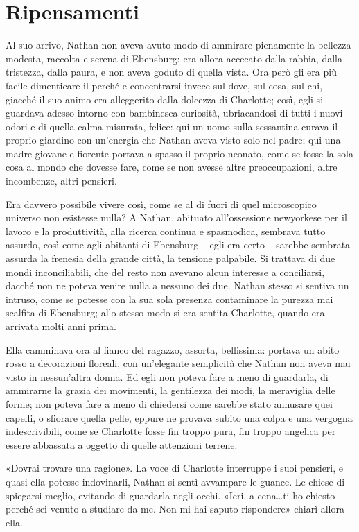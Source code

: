 \chapter{Ripensamenti}
\label{ch:ripensamenti}

Al suo arrivo, Nathan non aveva avuto modo di ammirare pienamente la bellezza modesta, raccolta e
serena di Ebensburg: era allora accecato dalla rabbia, dalla tristezza, dalla paura, e non aveva
goduto di quella vista. Ora però gli era più facile dimenticare il perché e concentrarsi invece sul
dove, sul cosa, sul chi, giacché il suo animo era alleggerito dalla dolcezza di Charlotte; così,
egli si guardava adesso intorno con bambinesca curiosità, ubriacandosi di tutti i nuovi odori e di
quella calma misurata, felice: qui un uomo sulla sessantina curava il proprio giardino con
un'energia che Nathan aveva visto solo nel padre; qui una madre giovane e fiorente portava a spasso
il proprio neonato, come se fosse la sola cosa al mondo che dovesse fare, come se non avesse altre
preoccupazioni, altre incombenze, altri pensieri.

Era davvero possibile vivere così, come se al di fuori di quel microscopico universo non esistesse
nulla? A Nathan, abituato all'ossessione newyorkese per il lavoro e la produttività, alla ricerca
continua e spasmodica, sembrava tutto assurdo, così come agli abitanti di Ebensburg -- egli era
certo -- sarebbe sembrata assurda la frenesia della grande città, la tensione palpabile. Si trattava
di due mondi inconciliabili, che del resto non avevano alcun interesse a conciliarsi, dacché non ne
poteva venire nulla a nessuno dei due. Nathan stesso si sentiva un intruso, come se potesse con la
sua sola presenza contaminare la purezza mai scalfita di Ebensburg; allo stesso modo si era sentita
Charlotte, quando era arrivata molti anni prima.

Ella camminava ora al fianco del ragazzo, assorta, bellissima: portava un abito rosso a decorazioni
floreali, con un'elegante semplicità che Nathan non aveva mai visto in nessun'altra donna. Ed egli
non poteva fare a meno di guardarla, di ammirarne la grazia dei movimenti, la gentilezza dei modi,
la meraviglia delle forme; non poteva fare a meno di chiedersi come sarebbe stato annusare quei
capelli, o sfiorare quella pelle, eppure ne provava subito una colpa e una vergogna indescrivibili,
come se Charlotte fosse fin troppo pura, fin troppo angelica per essere abbassata a oggetto di
quelle attenzioni terrene.

«Dovrai trovare una ragione». La voce di Charlotte interruppe i suoi pensieri, e quasi ella potesse
indovinarli, Nathan si sentì avvampare le guance. Le chiese di spiegarsi meglio, evitando di
guardarla negli occhi. «Ieri, a cena\dots ti ho chiesto perché sei venuto a studiare da me. Non mi
hai saputo rispondere» chiarì allora ella.

